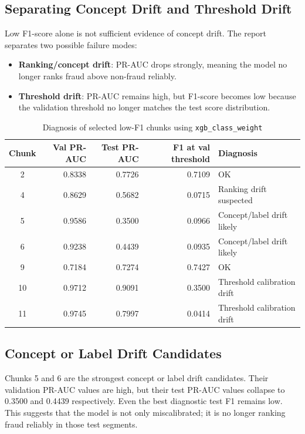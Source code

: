 \documentclass[12pt,a4paper]{article}
\begin{document}
\subsection{Separating Concept Drift and Threshold Drift}

Low F1-score alone is not sufficient evidence of concept drift. The report separates two possible failure modes:
\begin{itemize}
    \item \textbf{Ranking/concept drift}: PR-AUC drops strongly, meaning the model no longer ranks fraud above non-fraud reliably.
    \item \textbf{Threshold drift}: PR-AUC remains high, but F1-score becomes low because the validation threshold no longer matches the test score distribution.
\end{itemize}

\begin{table}[H]
\centering
\caption{Diagnosis of selected low-F1 chunks using \texttt{xgb\_class\_weight}}
\begin{tabular}{crrrl}
\toprule
\textbf{Chunk} & \textbf{Val PR-AUC} & \textbf{Test PR-AUC} & \textbf{F1 at val threshold} & \textbf{Diagnosis} \\
\midrule
2 & 0.8338 & 0.7726 & 0.7109 & OK \\
4 & 0.8629 & 0.5682 & 0.0715 & Ranking drift suspected \\
5 & 0.9586 & 0.3500 & 0.0966 & Concept/label drift likely \\
6 & 0.9238 & 0.4439 & 0.0935 & Concept/label drift likely \\
9 & 0.7184 & 0.7274 & 0.7427 & OK \\
10 & 0.9712 & 0.9091 & 0.3500 & Threshold calibration drift \\
11 & 0.9745 & 0.7997 & 0.0414 & Threshold calibration drift \\
\bottomrule
\end{tabular}
\end{table}

\subsection{Concept or Label Drift Candidates}

Chunks 5 and 6 are the strongest concept or label drift candidates. Their validation PR-AUC values are high, but their test PR-AUC values collapse to 0.3500 and 0.4439 respectively. Even the best diagnostic test F1 remains low. This suggests that the model is not only miscalibrated; it is no longer ranking fraud reliably in those test segments.
\end{document}
